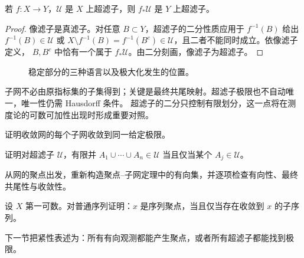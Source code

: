 \begin{proposition}[超滤子像]\label{proposition:1-1-3-4}
若 \(f:X\to Y\)，\(\mathcal U\) 是 \(X\) 上超滤子，则 \(f_*\mathcal U\) 是 \(Y\) 上超滤子。
\end{proposition}
\begin{proof}
像滤子是真滤子。对任意 \(B\subset Y\)，超滤子的二分性质应用于 \(f^{-1}(B)\) 给出
\(f^{-1}(B)\in\mathcal U\) 或
\(X\setminus f^{-1}(B)=f^{-1}(B^c)\in\mathcal U\)，且二者不能同时成立。依像滤子定义，
\(B,B^c\) 中恰有一个属于 \(f_*\mathcal U\)。由二分刻画，像滤子为超滤子。
\end{proof}

\begin{figure}[htbp]
\centering
{}
\caption{稳定部分的三种语言以及极大化发生的位置。}\label{fig:1-1-3-cluster-subnet-ultrafilter}
\end{figure}

子网不必由原指标集的子集得到；关键是最终共尾映射。超滤子极限也不自动唯一，唯一性仍需 Hausdorff 条件。
超滤子的二分只控制有限划分，这一点将在测度论的可数可加性出现时形成重要对照。

\begin{exercise}
证明收敛网的每个子网收敛到同一给定极限。
\end{exercise}
\begin{exercise}
证明对超滤子 \(\mathcal U\)，有限并 \(A_1\cup\cdots\cup A_n\in\mathcal U\) 当且仅当某个
\(A_j\in\mathcal U\)。
\end{exercise}
\begin{exercise}
从网的聚点出发，重新构造聚点--子网定理中的有向集，并逐项检查有向性、最终共尾性与收敛性。
\end{exercise}
\begin{exercise}
设 \(X\) 第一可数。对普通序列证明：\(x\) 是序列聚点，当且仅当存在收敛到 \(x\) 的子序列。
\end{exercise}

下一节把紧性表述为：所有有向观测都能产生聚点，或者所有超滤子都能找到极限。
